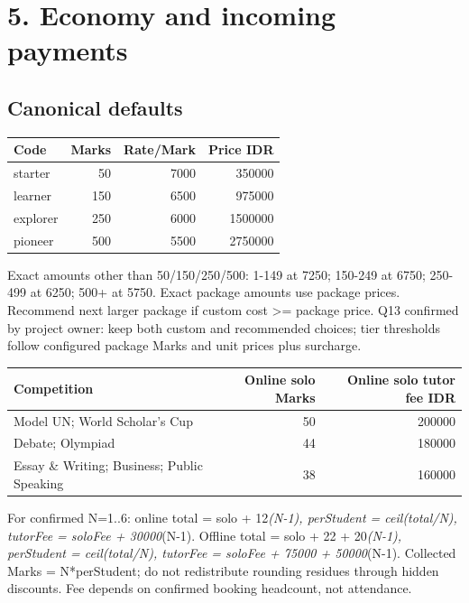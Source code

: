 \documentclass[11pt,a4paper]{article}
\newcounter{none}
\begin{document}
\section{5. Economy and incoming payments}\label{economy-and-incoming-payments}

\subsection{Canonical defaults}\label{canonical-defaults}

{\def\LTcaptype{none} %
\begin{longtable}[]{@{}lrrr@{}}
\toprule\noalign{}
Code & Marks & Rate/Mark & Price IDR \\
\midrule\noalign{}
\endhead
\bottomrule\noalign{}
\endlastfoot
starter & 50 & 7000 & 350000 \\
learner & 150 & 6500 & 975000 \\
explorer & 250 & 6000 & 1500000 \\
pioneer & 500 & 5500 & 2750000 \\
\end{longtable}
}

Exact amounts other than 50/150/250/500: 1-149 at 7250; 150-249 at 6750; 250-499 at 6250; 500+ at 5750. Exact package amounts use package prices. Recommend next larger package if custom cost \textgreater= package price. Q13 confirmed by project owner: keep both custom and recommended choices; tier thresholds follow configured package Marks and unit prices plus surcharge.

{\def\LTcaptype{none} %
\begin{longtable}[]{@{}lrr@{}}
\toprule\noalign{}
Competition & Online solo Marks & Online solo tutor fee IDR \\
\midrule\noalign{}
\endhead
\bottomrule\noalign{}
\endlastfoot
Model UN; World Scholar's Cup & 50 & 200000 \\
Debate; Olympiad & 44 & 180000 \\
Essay \& Writing; Business; Public Speaking & 38 & 160000 \\
\end{longtable}
}

For confirmed N=1..6: online total = solo + 12\emph{(N-1), perStudent = ceil(total/N), tutorFee = soloFee + 30000}(N-1). Offline total = solo + 22 + 20\emph{(N-1), perStudent = ceil(total/N), tutorFee = soloFee + 75000 + 50000}(N-1). Collected Marks = N*perStudent; do not redistribute rounding residues through hidden discounts. Fee depends on confirmed booking headcount, not attendance.
\end{document}
